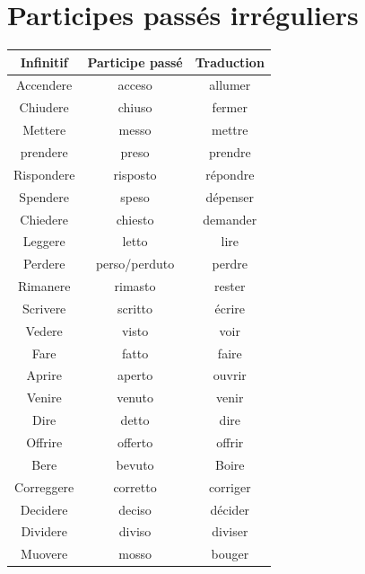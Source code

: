 \documentclass[12pt, openany]{report}
\begin{document}
\section{Participes passés irréguliers}
\begin{minipage}{.5\textwidth}
    \begin{center}
        \begin{tabular}{c|c|c}
            Infinitif & Participe passé & Traduction\\ \hline 
            Accendere & acceso & allumer \\
            Chiudere & chiuso & fermer \\
            Mettere & messo & mettre \\
            prendere & preso & prendre \\
            Rispondere & risposto & répondre \\
            Spendere & speso & dépenser \\
            Chiedere & chiesto & demander\\
            Leggere & letto & lire \\
            Perdere & perso/perduto & perdre \\
            Rimanere & rimasto & rester \\
            Scrivere & scritto & écrire \\
            Vedere & visto & voir \\
            Fare & fatto & faire\\
            Aprire & aperto & ouvrir\\
            Venire & venuto & venir\\
            Dire & detto & dire\\
            Offrire & offerto & offrir\\
            Bere & bevuto & Boire\\
            Correggere & corretto & corriger\\
            Decidere & deciso & décider\\
            Dividere & diviso & diviser\\
            Muovere & mosso & bouger\\
        \end{tabular}
    \end{center}
\end{minipage}
\end{document}
